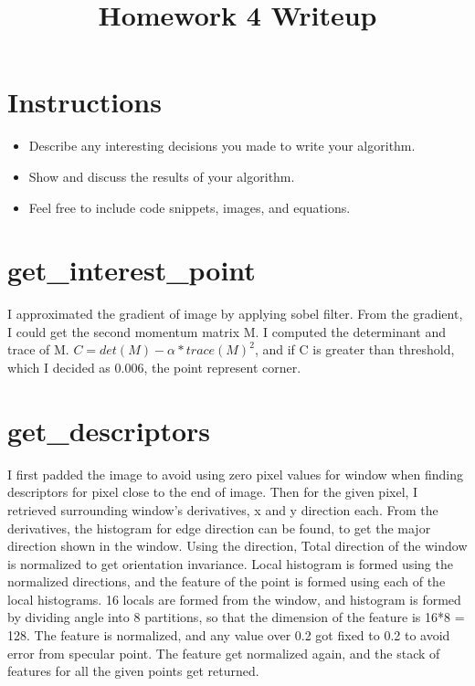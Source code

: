 \title{\vspace{-1cm}Homework 4 Writeup}



\maketitle
\vspace{-3cm}
\thispagestyle{fancy}

\section*{Instructions}
\begin{itemize}
  \item Describe any interesting decisions you made to write your algorithm.
  \item Show and discuss the results of your algorithm.
  \item Feel free to include code snippets, images, and equations.

\end{itemize}

\section*{get\_interest\_point}

I approximated the gradient of image by applying sobel filter. From the gradient, I could get the second momentum matrix M. I computed the determinant and trace of M. $C = det(M) - \alpha * trace(M)^2$, and if C is greater than threshold, which I decided as 0.006, the point represent corner. 

\section*{get\_descriptors}

I first padded the image to avoid using zero pixel values for window when finding descriptors for pixel close to the end of image. Then for the given pixel, I retrieved surrounding window's derivatives, x and y direction each. From the derivatives, the histogram for edge direction can be found, to get the major direction shown in the window. Using the direction, Total direction of the window is normalized to get orientation invariance. Local histogram is formed using the normalized directions, and the feature of the point is formed using each of the local histograms. 16 locals are formed from the window, and histogram is formed by dividing angle into 8 partitions, so that the dimension of the feature is 16*8 = 128. The feature is normalized, and any value over 0.2 got fixed to 0.2 to avoid error from specular point. The feature get normalized again, and the stack of features for all the given points get returned.

